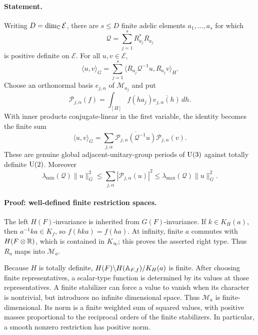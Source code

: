 \documentclass[11pt]{article}
\theoremstyle{definition}\newtheorem{definition}[theorem]{Definition}\newtheorem{remark}[theorem]{Remark}
\begin{document}
\paragraph{Statement.}
Writing $D=\dim_\mathbb C\mathcal E$, there are $s\leq D$ finite adelic
elements $a_1,\ldots,a_s$ for which
\[
 \mathcal Q=\sum_{j=1}^sR_{a_j}^*R_{a_j}
\]
is positive definite on $\mathcal E$. For all $u,v\in\mathcal E$,
\begin{equation}\label{A5-frame}
 \langle u,v\rangle_G
  =\sum_{j=1}^s
          \langle R_{a_j}\mathcal Q^{-1}u,R_{a_j}v\rangle_H.
\end{equation}
Choose an orthonormal basis $e_{j,\alpha}$ of $\mathcal M_{a_j}$ and
put
\[
 \mathcal P_{j,\alpha}(f)=
    \int_{[H]}f(ha_j)\overline{e_{j,\alpha}(h)}\,dh.
\]
With inner products conjugate-linear in the first variable, the
identity becomes the finite sum
\begin{equation}\label{A5-periods}
 \langle u,v\rangle_G
  =\sum_{j,\alpha}
       \overline{\mathcal P_{j,\alpha}(\mathcal Q^{-1}u)}
                   \mathcal P_{j,\alpha}(v).
\end{equation}
These are genuine global adjacent-unitary-group periods of $\operatorname{U}(3)$
against totally definite $\operatorname{U}(2)$. Moreover
\begin{equation}\label{A5-bounds}
 \lambda_{\min}(\mathcal Q)\|u\|_G^2
 \leq\sum_{j,\alpha}|\mathcal P_{j,\alpha}(u)|^2
 \leq\lambda_{\max}(\mathcal Q)\|u\|_G^2.
\end{equation}

\paragraph{Proof: well-defined finite restriction spaces.}
The left $H(F)$-invariance is inherited from $G(F)$-invariance. If
$k\in K_H(a)$, then $a^{-1}ka\in K_f$, so
$f(hka)=f(ha)$. At infinity, finite $a$ commutes with $H(F\otimes\mathbb R)$,
which is contained in $K_\infty$; this proves the asserted right type.
Thus $R_a$ maps into $\mathcal M_a$.

Because $H$ is totally definite,
$H(F)\backslash H(\mathbb A_{F,f})/K_H(a)$ is finite. After choosing finite
representatives, a scalar-type function is determined by its values
at those representatives. A finite stabilizer can force a value to
vanish when its character is nontrivial, but introduces no infinite
dimensional space. Thus $\mathcal M_a$ is finite-dimensional. Its
norm is a finite weighted sum of squared values, with positive masses
proportional to the reciprocal orders of the finite stabilizers. In
particular, a smooth nonzero restriction has positive norm.
\end{document}

